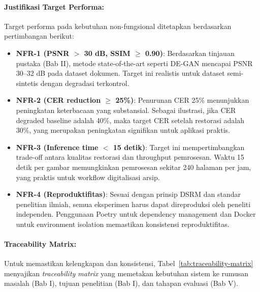 \paragraph{Justifikasi Target Performa:}

Target performa pada kebutuhan non-fungsional ditetapkan berdasarkan pertimbangan berikut:

\begin{itemize}
    \item \textbf{NFR-1 (PSNR $>$ 30 dB, SSIM $\geq$ 0.90)}: Berdasarkan tinjauan pustaka (Bab II), metode state-of-the-art seperti DE-GAN mencapai PSNR 30--32 dB pada dataset dokumen. Target ini realistis untuk dataset semi-sintetis dengan degradasi terkontrol.
    
    \item \textbf{NFR-2 (CER reduction $\geq$ 25\%)}: Penurunan CER 25\% menunjukkan peningkatan keterbacaan yang substansial. Sebagai ilustrasi, jika CER degraded baseline adalah 40\%, maka target CER setelah restorasi adalah 30\%, yang merupakan peningkatan signifikan untuk aplikasi praktis.
    
    \item \textbf{NFR-3 (Inference time $<$ 15 detik)}: Target ini mempertimbangkan trade-off antara kualitas restorasi dan throughput pemrosesan. Waktu 15 detik per gambar memungkinkan pemrosesan sekitar 240 halaman per jam, yang praktis untuk workflow digitalisasi arsip.
    
    \item \textbf{NFR-4 (Reproduktifitas)}: Sesuai dengan prinsip DSRM dan standar penelitian ilmiah, semua eksperimen harus dapat direproduksi oleh peneliti independen. Penggunaan Poetry untuk dependency management dan Docker untuk environment isolation memastikan konsistensi reproduktifitas.
\end{itemize}

\paragraph{Traceability Matrix:}

Untuk memastikan kelengkapan dan konsistensi, Tabel~\ref{tab:traceability-matrix} menyajikan \textit{traceability matrix} yang memetakan kebutuhan sistem ke rumusan masalah (Bab I), tujuan penelitian (Bab I), dan tahapan evaluasi (Bab V).

